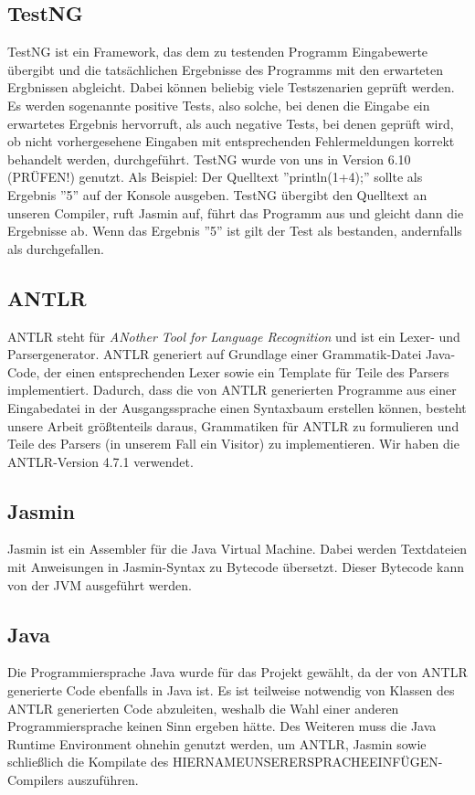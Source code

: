 \documentclass[12pt, a4paper, oneside, ngerman]{article}
\begin{document}
\subsection{TestNG}
TestNG ist ein Framework, das dem zu testenden Programm Eingabewerte übergibt und die tatsächlichen Ergebnisse des Programms mit den erwarteten Ergbnissen abgleicht. Dabei können beliebig viele Testszenarien geprüft werden. Es werden sogenannte positive Tests, also solche, bei denen die Eingabe ein erwartetes Ergebnis hervorruft, als auch negative Tests, bei denen geprüft wird, ob nicht vorhergesehene Eingaben mit entsprechenden Fehlermeldungen korrekt behandelt werden, durchgeführt. TestNG wurde von uns in Version 6.10 (PRÜFEN!) genutzt.
\linebreak
Als Beispiel: Der Quelltext ''println(1+4);'' sollte als Ergebnis ''5'' auf der Konsole ausgeben. TestNG übergibt den Quelltext an unseren Compiler, ruft Jasmin auf, führt das Programm aus und gleicht dann die Ergebnisse ab. Wenn das Ergebnis ''5'' ist gilt der Test als bestanden, andernfalls als durchgefallen. 

\subsection{ANTLR}
ANTLR steht für \textit{ANother Tool for Language Recognition} und ist ein Lexer- und Parsergenerator. ANTLR generiert auf Grundlage einer Grammatik-Datei Java-Code, der einen entsprechenden Lexer sowie ein Template für Teile des Parsers implementiert. Dadurch, dass die von ANTLR generierten Programme aus einer Eingabedatei in der Ausgangssprache einen Syntaxbaum erstellen können, besteht unsere Arbeit größtenteils daraus, Grammatiken für ANTLR zu formulieren und Teile des Parsers (in unserem Fall ein Visitor) zu implementieren. Wir haben die ANTLR-Version 4.7.1 verwendet.

\subsection{Jasmin}
Jasmin ist ein Assembler für die Java Virtual Machine. Dabei werden Textdateien mit Anweisungen in Jasmin-Syntax zu Bytecode übersetzt. Dieser Bytecode kann von der JVM ausgeführt werden.

\subsection{Java}
Die Programmiersprache Java wurde für das Projekt gewählt, da der von ANTLR generierte Code ebenfalls in Java ist. Es ist teilweise notwendig von Klassen des ANTLR generierten Code abzuleiten, weshalb die Wahl einer anderen Programmiersprache keinen Sinn ergeben hätte. 
Des Weiteren muss die Java Runtime Environment ohnehin genutzt werden, um ANTLR, Jasmin sowie schließlich die Kompilate des HIERNAMEUNSERERSPRACHEEINFÜGEN-Compilers auszuführen.
\end{document}

